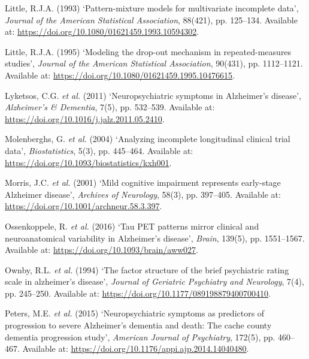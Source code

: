\documentclass[
  9pt,
  letterpaper,
  DIV=11,
  numbers=noendperiod]{scrartcl}
\newlength{\cslhangindent}
\newenvironment{CSLReferences}[2] %
 {\begin{list}{}{%
  \setlength{\itemindent}{0pt}
  \setlength{\leftmargin}{0pt}
  \setlength{\parsep}{0pt}
  \ifodd #1
   \setlength{\leftmargin}{\cslhangindent}
   \setlength{\itemindent}{-1\cslhangindent}
  \fi
  \setlength{\itemsep}{#2\baselineskip}}}
 {\end{list}}
\begin{document}
\begin{CSLReferences}{0}{1}
Little, R.J.A. (1993) {`Pattern-mixture models for multivariate
incomplete data'}, \emph{Journal of the American Statistical
Association}, 88(421), pp. 125--134. Available at:
\url{https://doi.org/10.1080/01621459.1993.10594302}.

Little, R.J.A. (1995) {`Modeling the drop-out mechanism in
repeated-measures studies'}, \emph{Journal of the American Statistical
Association}, 90(431), pp. 1112--1121. Available at:
\url{https://doi.org/10.1080/01621459.1995.10476615}.

Lyketsos, C.G. \emph{et al.} (2011) {`Neuropsychiatric symptoms in
{Alzheimer}'s disease'}, \emph{Alzheimer's \& Dementia}, 7(5), pp.
532--539. Available at:
\url{https://doi.org/10.1016/j.jalz.2011.05.2410}.

Molenberghs, G. \emph{et al.} (2004) {`Analyzing incomplete longitudinal
clinical trial data'}, \emph{Biostatistics}, 5(3), pp. 445--464.
Available at: \url{https://doi.org/10.1093/biostatistics/kxh001}.

Morris, J.C. \emph{et al.} (2001) {`Mild cognitive impairment represents
early-stage {Alzheimer} disease'}, \emph{Archives of Neurology}, 58(3),
pp. 397--405. Available at:
\url{https://doi.org/10.1001/archneur.58.3.397}.

Ossenkoppele, R. \emph{et al.} (2016) {`Tau {PET} patterns mirror
clinical and neuroanatomical variability in {Alzheimer}'s disease'},
\emph{Brain}, 139(5), pp. 1551--1567. Available at:
\url{https://doi.org/10.1093/brain/aww027}.

Ownby, R.L. \emph{et al.} (1994) {`The factor structure of the brief
psychiatric rating scale in alzheimer's disease'}, \emph{Journal of
Geriatric Psychiatry and Neurology}, 7(4), pp. 245--250. Available at:
\url{https://doi.org/10.1177/089198879400700410}.

Peters, M.E. \emph{et al.} (2015) {`Neuropsychiatric symptoms as
predictors of progression to severe {Alzheimer}'s dementia and death:
The cache county dementia progression study'}, \emph{American Journal of
Psychiatry}, 172(5), pp. 460--467. Available at:
\url{https://doi.org/10.1176/appi.ajp.2014.14040480}.


\end{CSLReferences}
\end{document}
